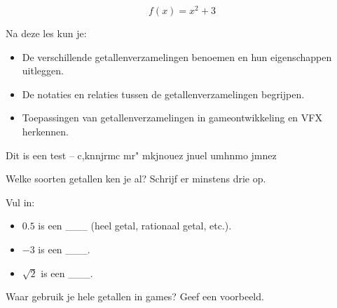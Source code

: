 \documentclass{myximera}
\begin{document}


\begin{exercise}
    \[f(x)=x^2+3\]
\end{exercise}

Na deze les kun je:
\begin{itemize}
    \item De verschillende getallenverzamelingen benoemen en hun eigenschappen uitleggen.
    \item De notaties en relaties tussen de getallenverzamelingen begrijpen.
    \item Toepassingen van getallenverzamelingen in gameontwikkeling en VFX herkennen.
\end{itemize}
\begin{doelstelling}
    Dit is een test -- c,knnjrmc mr" mkjnouez jnuel umhnmo jmnez
\end{doelstelling}
\begin{exercise}
\begin{question}
Welke soorten getallen ken je al? Schrijf er minstens drie op.
\end{question}
\begin{question}
Vul in:
\begin{itemize}
    \item \( 0.5 \) is een \_\_\_ (heel getal, rationaal getal, etc.).
    \item \( -3 \) is een \_\_\_.
    \item \( \sqrt{2} \) is een \_\_\_.
\end{itemize}
\end{question}
\begin{question}
Waar gebruik je hele getallen in games? Geef een voorbeeld.
\end{question}
\end{exercise}

\end{document}
